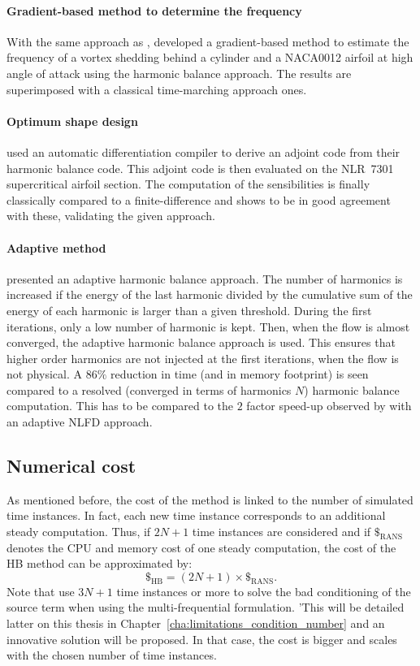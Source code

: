 \paragraph{Gradient-based method to determine the frequency}
With the same approach as \citet{McMullen2002}, \citet{Gopinath2006}
developed a gradient-based method to estimate the frequency of a 
vortex shedding behind a cylinder and a NACA0012 airfoil 
at high angle of attack using the harmonic balance approach.
The results are superimposed with a classical time-marching approach ones.

\paragraph{Optimum shape design}
\citet{Thomas2005b} used an automatic 
differentiation compiler to derive an adjoint code
from their harmonic balance code. This adjoint code is then
evaluated on the NLR~7301 supercritical airfoil section.
The computation of the sensibilities is finally
classically compared to a finite-difference and shows
to be in good agreement with these, validating
the given approach.

\paragraph{Adaptive method}
\citet{Maple2004} presented an adaptive harmonic
balance approach. The number of harmonics is increased
if the energy of the last harmonic divided by the cumulative
sum of the energy of each harmonic is larger than a 
given threshold. During the first iterations, only
a low number of harmonic is kept. Then, when the flow
is almost converged, the adaptive harmonic balance
approach is used. This ensures that higher order harmonics
are not injected at the first iterations, when the
flow is not physical. A $86\%$ reduction in time (and
in memory footprint) is seen compared to a resolved (converged in
terms of harmonics $N$) harmonic
balance computation. This has to be compared to
the $2$ factor speed-up observed by \citet{Mosahebi2013}
with an adaptive NLFD approach.

\subsection{Numerical cost}
\label{sec:sm_hb_cost}
As mentioned before, the cost of the method is linked to
the number of simulated time instances.
In fact, each new time instance corresponds to an additional steady computation.
Thus, if \mbox{$2N+1$} time instances are considered and if $\mathdollar_{\text{RANS}}$ 
denotes the CPU and memory cost of
one steady computation, the cost of the HB method can be 
approximated by:
\begin{equation}
	\mathdollar_{\text{HB}} = (2N+1) \times \mathdollar_{\text{RANS}}.
\end{equation}
Note that \citet{Ekici2007,Ekici2008a} use $3N+1$
time instances or more to solve the bad conditioning of the
source term when using the multi-frequential formulation. 
'This will be detailed latter on this thesis in 
Chapter~\ref{cha:limitations_condition_number} and an innovative solution
will be proposed. In that
case, the cost is bigger and scales with the chosen number
of time instances.
